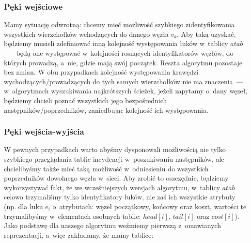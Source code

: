 \subsubsection{Pęki wejściowe}


Mamy sytuację odwrotną: chcemy mieć możliwość szybkiego zidentyfikowania wszystkich wierzchołków wchodzących do danego węzła $v_{k}$.
Aby taką uzyskać, będziemy musieli zdefiniować inną kolejność występowania łuków w~tablicy $atab$~--- będą one występować w~kolejności rosnących identyfikatorów węzłów, do których prowadzą, a~nie, gdzie mają swój początek.
Reszta algorytmu pozostaje bez zmian.
W obu przypadkach kolejność występowania krawędzi wychodzących/prowadzących do tych samych wierzchołków nie ma znaczenia~--- w~algorytmach wyszukiwania najkrótszych ścieżek, jeżeli zapytamy o~dany węzeł, będziemy chcieli poznać wszystkich jego bezpośrednich następników/poprzedników, zaniedbując kolejność ich występowania.


\subsubsection{Pęki wejścia-wyjścia}


W pewnych przypadkach warto abyśmy dysponowali możliwością nie tylko szybkiego przeglądania tablic incydencji w~poszukiwaniu następników, ale chcielibyśmy także mieć taką możliwość w~odniesieniu do wszystkich poprzedników dowolnego węzła w~sieci.
Aby zrobić to oszczędnie, będziemy wykorzystywać fakt, że we wcześniejszych wersjach algorytmu, w~tablicy $atab$ celowo trzymaliśmy tylko identyfikatory łuków, nie zaś ich wszystkie atrybuty (np. dla łuku $e_{i}$ o~atrybutach: węzeł początkowy, końcowy oraz koszt, wartości te trzymalibyśmy w~elementach osobnych tablic: $head \left[ i \right]$,  $tail \left[ i \right]$ oraz $cost \left[ i \right]$).
Jako podstawę dla naszego algorytmu weźmiemy pierwszą z~omawianych reprezentacji, a~więc zakładamy, że mamy tablice:

